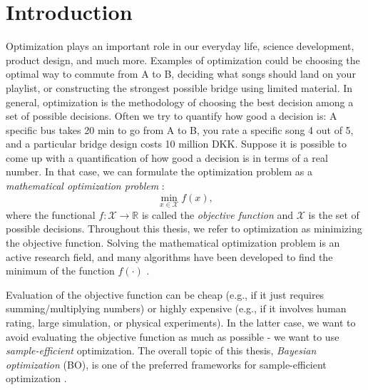 \chapter{Introduction}



Optimization plays an important role in our everyday life, science development, product design, and
much more. Examples of optimization could be choosing the optimal way to commute from A to B,
deciding what songs should land on your playlist, or constructing the strongest possible bridge
using limited material. In general, optimization is the methodology of choosing the best decision
among a set of possible decisions. Often we try to quantify how good a decision is: A specific bus
takes 20 min to go from A to B, you rate a specific song 4 out of 5, and a particular bridge design
costs 10 million DKK. Suppose it is possible to come up with a quantification of how good a
decision is in terms of a real number. In that case, we can formulate the optimization problem as
a \textit{mathematical optimization problem} \cite[1]{boyd2004convex}: 
$$\min_{x\in \mathcal{X}} f(x),$$ where the functional $f: \mathcal{X} \rightarrow \mathbb{R}$ is
called the \textit{objective function} and $\mathcal{X}$ is the set of possible decisions.
Throughout this thesis, we refer to optimization as minimizing the objective function. Solving the
mathematical optimization problem is an active research field, and many algorithms have been
developed to find the minimum of the function $f(\cdot)$ \cite{boyd2004convex}.

Evaluation of the objective function can be cheap (e.g., if it just requires summing/multiplying
numbers) or highly expensive (e.g., if it involves human rating, large simulation, or physical
experiments). In the latter case, we want to avoid evaluating the objective function as much as
possible - we want to use \textit{sample-efficient} optimization. The overall topic of this thesis,
\textit{Bayesian optimization} (BO), is one of the preferred frameworks for sample-efficient
optimization \cite{TakeHumanOutOfLoop}.

